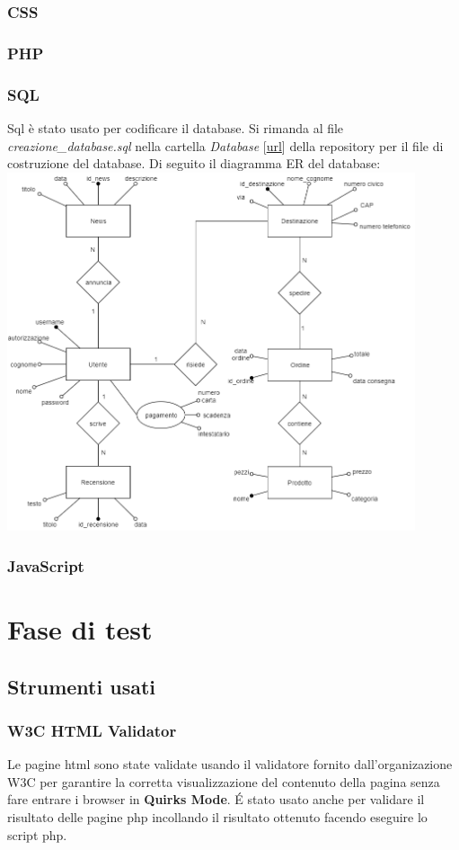 \documentclass{article}
\begin{document}
			\subsubsection{CSS}
			\subsubsection{PHP}
			\subsubsection{SQL}
			Sql è stato usato per codificare il database. Si rimanda al file \textit{creazione\_database.sql} nella cartella \textit{Database} [\href{https://github.com/Mirco469/ProgettoSushi/tree/master/Database}{url}] della repository per il file di costruzione del database. Di seguito il diagramma ER del database:\newline
			\includegraphics[width=12cm]{DiagrammaER.png}
			\subsubsection{JavaScript}
	\section{Fase di test}
		\subsection{Strumenti usati}
			\subsubsection{W3C HTML Validator}
				Le pagine html sono state validate usando il validatore fornito dall'organizazione W3C per garantire la corretta visualizzazione del contenuto della pagina senza fare entrare i browser in {\bfseries Quirks Mode}. \'E stato usato anche per validare il risultato delle pagine php incollando il risultato ottenuto facendo eseguire lo script php.
\end{document}
